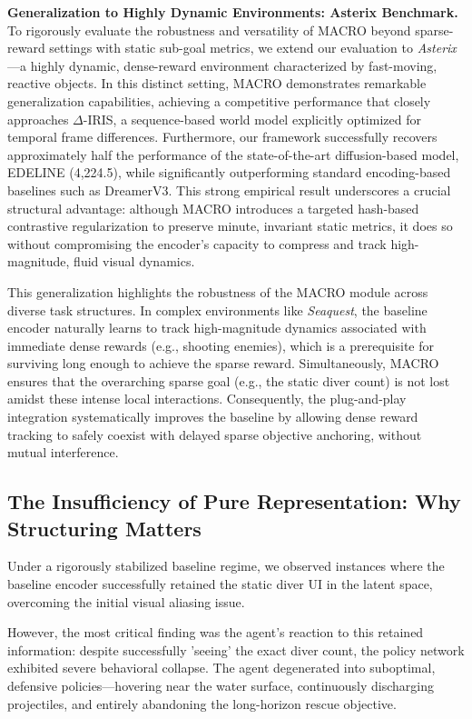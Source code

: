 \documentclass{article} %
\begin{document}
\textbf{Generalization to Highly Dynamic Environments: Asterix Benchmark.} 
To rigorously evaluate the robustness and versatility of MACRO beyond sparse-reward settings with static sub-goal metrics, we extend our evaluation to \textit{Asterix}---a highly dynamic, dense-reward environment characterized by fast-moving, reactive objects. In this distinct setting, MACRO demonstrates remarkable generalization capabilities, achieving a competitive performance that closely approaches $\Delta$-IRIS, a sequence-based world model explicitly optimized for temporal frame differences. Furthermore, our framework successfully recovers approximately half the performance of the state-of-the-art diffusion-based model, EDELINE (4,224.5), while significantly outperforming standard encoding-based baselines such as DreamerV3. This strong empirical result underscores a crucial structural advantage: although MACRO introduces a targeted hash-based contrastive regularization to preserve minute, invariant static metrics, it does so without compromising the encoder's capacity to compress and track high-magnitude, fluid visual dynamics.

This generalization highlights the robustness of the MACRO module across diverse task structures. In complex environments like \textit{Seaquest}, the baseline encoder naturally learns to track high-magnitude dynamics associated with immediate dense rewards (e.g., shooting enemies), which is a prerequisite for surviving long enough to achieve the sparse reward. Simultaneously, MACRO ensures that the overarching sparse goal (e.g., the static diver count) is not lost amidst these intense local interactions. Consequently, the plug-and-play integration systematically improves the baseline by allowing dense reward tracking to safely coexist with delayed sparse objective anchoring, without mutual interference.

\subsection{The Insufficiency of Pure Representation: Why Structuring Matters}
Under a rigorously stabilized baseline regime, we observed instances where the baseline encoder successfully retained the static diver UI in the latent space, overcoming the initial visual aliasing issue. 

However, the most critical finding was the agent's reaction to this retained information: despite successfully 'seeing' the exact diver count, the policy network exhibited severe behavioral collapse. The agent degenerated into suboptimal, defensive policies—hovering near the water surface, continuously discharging projectiles, and entirely abandoning the long-horizon rescue objective.
\end{document}
